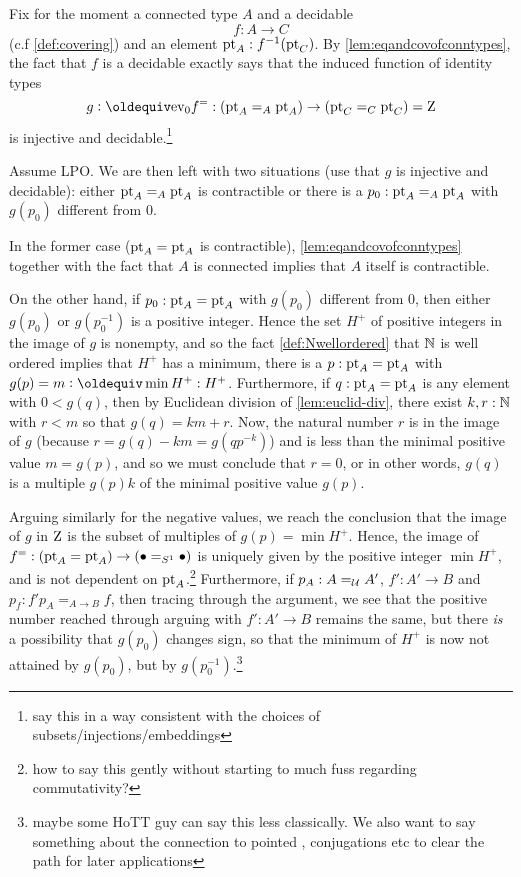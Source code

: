 Fix for the moment a connected type $A$ and a decidable \covering 
$$f:A\to C$$ (c.f \cref{def:covering}) and an element ${\mathord{\mathrm{pt}}}_A:f^{-1}({\mathord{\mathrm{pt}}}_C)$.  %
By \cref{lem:eqandcovofconntypes}, the fact that $f$ is a decidable \covering exactly says that the induced function of identity types
$$g\defequi\ev_0f^=:(\pt_A=_A\pt_A)\to (\pt_C=_C\pt_C)=\zet$$ is injective and decidable.\footnote{say this in a way consistent with the choices of subsets/injections/embeddings}    

Assume LPO.  We are then left with two situations (use that $g$ is injective and decidable): either ${\mathord{\mathrm{pt}}}_A=_A{\mathord{\mathrm{pt}}}_A$ is contractible or there is a $p_0:{\mathord{\mathrm{pt}}}_A=_A{\mathord{\mathrm{pt}}}_A$ with $g(p_0)$ different from $0$. 

In the former case (${\mathord{\mathrm{pt}}}_A={\mathord{\mathrm{pt}}}_A$ is contractible), \cref{lem:eqandcovofconntypes} together with the fact that $A$ is connected implies that $A$ itself is contractible.  

On the other hand, if $p_0:{\mathord{\mathrm{pt}}}_A={\mathord{\mathrm{pt}}}_A$ with $g(p_0)$ different from $0$, then either $g(p_0)$ or $g(p_0^{-1})$ is a positive integer.  Hence the set $H^+$ of positive integers in the image of $g$ is nonempty, and so the fact \cref{def:Nwellordered} that $\mathbb{N}$ is well ordered implies that $H^+$ has a minimum, \ie there is a $p:{\mathord{\mathrm{pt}}}_A={\mathord{\mathrm{pt}}}_A$ with  $g(p)=m\defequi\min H^+:H^+$.  Furthermore, if $q:{\mathord{\mathrm{pt}}}_A={\mathord{\mathrm{pt}}}_A$ is any element with $0<g(q)$, then  by Euclidean division of \cref{lem:euclid-div}, there exist $k,r:\mathbb{N}$ with $r<m$ so that $g(q)=km+r$.  Now, the natural number $r$ is in the image of $g$ (because $r=g(q)-km=g(qp^{-k})$) and is less than the minimal positive value $m=g(p)$, and so we must conclude that $r=0$, or in other words, $g(q)$ is a multiple $g(p)k$ of the minimal positive value $g(p)$.


Arguing similarly for the negative values, we reach the conclusion that the image of $g$ in $\mathrm{Z}$ is the subset of multiples of $g(p)=\min H^+$.  Hence, the image of $f^=:({\mathord{\mathrm{pt}}}_A={\mathord{\mathrm{pt}}}_A)\to(\bullet=_{S^1}\bullet)$ is uniquely given by the positive integer $\min H^+$, and is not dependent on ${\mathord{\mathrm{pt}}}_A$.\footnote{how to say this gently without starting to much fuss regarding commutativity?}  Furthermore, if $p_A:A=_{\mathcal{U}}A'$, $f':A'\to B$ and $p_f:f'p_A=_{A\to B}f$, then tracing through the argument, we see that the positive number reached through arguing with $f':A'\to B$ remains the same, but there \emph{is} a possibility that $g(p_0)$ changes sign, so that the minimum of $H^+$ is now not attained by $g(p_0)$, but by $g(p_0^{-1})$.\footnote{maybe some HoTT guy can say this less classically.  We also want to say something about the connection to pointed \coverings, conjugations etc to clear the path for later applications}

